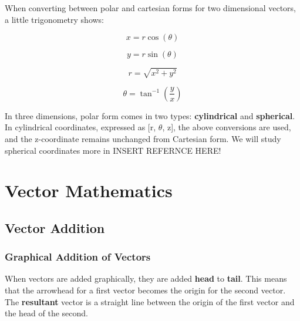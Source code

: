 	When converting between polar and cartesian forms for two dimensional vectors, a little trigonometry shows: 
		\begin{mdframed}[backgroundcolor=orange!20!white]
	
	\color{blue}
	\begin{multicols}{2}
		\begin{center}
			\begin{equation}
			x = r \cos(\theta)
			\label{eq11}
			\end{equation}
			
			\begin{equation}
			y = r \sin(\theta)
			\end{equation}

			\begin{equation}
			r = \sqrt{x^2+y^2}			
			\end{equation}

			\begin{equation}
			\theta=\tan^{-1}(\frac{y}{x})
			\label{eq14}
			\end{equation}		
		\end{center}
	\end{multicols}
	\color{black}
	\end{mdframed}
	
	In three dimensions, polar form comes in two types: \textbf{cylindrical} and \textbf{spherical}.  In cylindrical coordinates, expressed as [r, $\theta$, z],  the above conversions are used, and the z-coordinate remains unchanged from Cartesian form.  We will study spherical coordinates more in \color{red} INSERT REFERNCE HERE! \color{black}

	
	
	
	
\section{Vector Mathematics}
	\subsection{Vector Addition} 
	\subsubsection{Graphical Addition of Vectors} 
	When vectors are added graphically, they are added \textbf{head} to \textbf{tail}.  This means that the arrowhead for a first vector becomes the origin for the second vector.  The \textbf{resultant} vector is a straight line between the origin of the first vector and the head of the second.  
	
